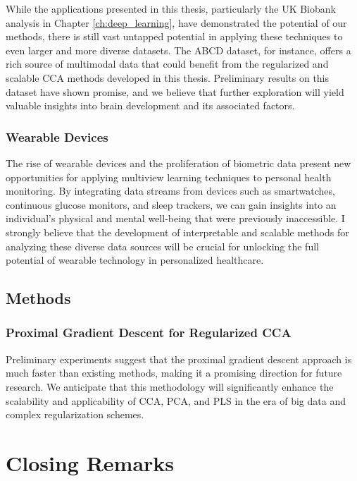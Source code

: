 While the applications presented in this thesis, particularly the UK Biobank analysis in Chapter \ref{ch:deep_learning}, have demonstrated the potential of our methods, there is still vast untapped potential in applying these techniques to even larger and more diverse datasets. The ABCD dataset, for instance, offers a rich source of multimodal data that could benefit from the regularized and scalable CCA methods developed in this thesis. Preliminary results on this dataset have shown promise, and we believe that further exploration will yield valuable insights into brain development and its associated factors.

\subsubsection{Wearable Devices}

The rise of wearable devices and the proliferation of biometric data present new opportunities for applying multiview learning techniques to personal health monitoring. By integrating data streams from devices such as smartwatches, continuous glucose monitors, and sleep trackers, we can gain insights into an individual's physical and mental well-being that were previously inaccessible. I strongly believe that the development of interpretable and scalable methods for analyzing these diverse data sources will be crucial for unlocking the full potential of wearable technology in personalized healthcare.

\subsection{Methods}

\subsubsection{Proximal Gradient Descent for Regularized CCA}

Preliminary experiments suggest that the proximal gradient descent approach is much faster than existing methods, making it a promising direction for future research. We anticipate that this methodology will significantly enhance the scalability and applicability of CCA, PCA, and PLS in the era of big data and complex regularization schemes.



\section{Closing Remarks}

